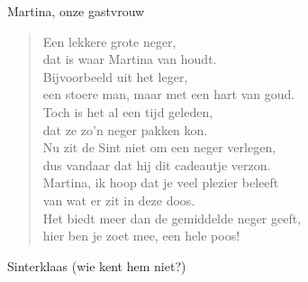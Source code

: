 \documentclass[12pt]{brief}
\date{4 december 2004}
\begin{document}
\begin{letter}{Martina, onze gastvrouw}

\opening{}


\begin{verse}

Een lekkere grote neger,\\
dat is waar Martina van houdt.\\
Bijvoorbeeld uit het leger,\\
een stoere man, maar met een hart van goud.\\[0.5em]

Toch is het al een tijd geleden,\\
dat ze zo'n neger pakken kon.\\
Nu zit de Sint niet om een neger verlegen,\\
dus vandaar dat hij dit cadeautje verzon.\\[0.5em]

Martina, ik hoop dat je veel plezier beleeft\\
van wat er zit in deze doos.\\
Het biedt meer dan de gemiddelde neger geeft,\\
hier ben je zoet mee, een hele poos!\\[2em]

\end{verse}


Sinterklaas (wie kent hem niet?)


\closing{}

\end{letter}
\end{document}
